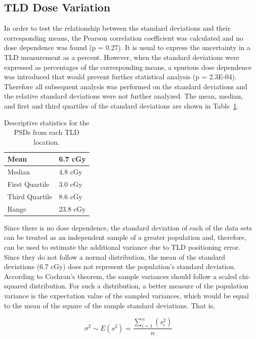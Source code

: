\subsection{TLD Dose Variation}
In order to test the relationship between the standard deviations and their corresponding means, the Pearson correlation coefficient was calculated and no dose dependence was found (p = 0.27).    It is usual to express the uncertainty in a TLD measurement as a percent. However, when the standard deviations were expressed as percentages of the corresponding means, a spurious dose dependence was introduced that would prevent further statistical analysis (p = 2.3E-04). Therefore all subsequent analysis was performed on the standard deviations and the relative standard deviations were not further analyzed. The mean, median, and first and third quartiles of the standard deviations are shown in Table~\ref{tab:descrip_stats}.

\begin{table}[h]
	\centering
	\caption{Descriptive statistics for the PSDs from each TLD location.}
	\label{tab:descrip_stats}
	\begin{tabular}{|l|l|}
		\hline
		Mean           & 6.7 cGy  \\ \hline
		Median         & 4.8 cGy  \\ \hline
		First Quartile & 3.0 cGy  \\ \hline
		Third Quartile & 8.6 cGy  \\ \hline
		Range          & 23.8 cGy \\ \hline
	\end{tabular}
\end{table}

Since there is no dose dependence, the standard deviation of each of the data sets can be treated as an independent sample of a greater population and, therefore, can be used to estimate the additional variance due to TLD positioning error. Since they do not follow a normal distribution, the mean of the standard deviations (6.7 cGy) does not represent the population’s standard deviation. According to Cochran’s theorem,\cite{Knight1999} the sample variances should follow a scaled chi-squared distribution. For such a distribution, a better measure of the population variance is the expectation value of the sampled variances, which would be equal to the mean of the square of the sample standard deviations. That is,

\begin{equation}
	\label{eq:cochran}
	\sigma^2 \sim E\left(s^2\right) = \frac{\sum_{i=1}^n \left(s_i^2\right)}{n}
\end{equation}

